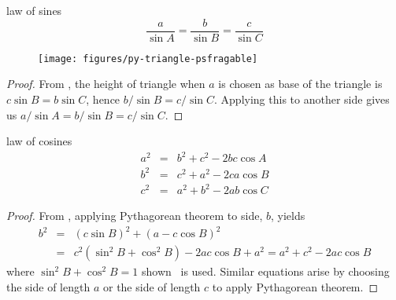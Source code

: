 \documentclass[17pt,landscape]{foils}
\begin{document}
{{

\bit
\item
	\bit
	\item
	\eit

\vitem
	\bit
	\item
	\eit
\eit



\begin{mylaw}{law of sines}
	$$
		\frac{a}{\sin A}
			=
		\frac{b}{\sin B}
			=
		\frac{c}{\sin C}
	$$
\end{mylaw}

\vfill
\begin{figure}
\begin{center}
	\texttt{[image: figures/py-triangle-psfragable]}%
		\label{fig:triangle}
\end{center}
\end{figure}

\vfill
\begin{proof}
	From , the height of triangle when $a$ is chosen as base of the triangle is $c\sin B = b\sin C$,
	hence $b/\sin B = c/\sin C$.
	Applying this to another side gives us $a/\sin A = b/\sin B = c/\sin C$.
\end{proof}



\begin{mylaw}{law of cosines}
	\begin{eqnarray*}
		a^2 &=& b^2 + c^2 - 2bc \cos A
		\\
		b^2 &=& c^2 + a^2 - 2ca \cos B
		\\
		c^2 &=& a^2 + b^2 - 2ab \cos C
	\end{eqnarray*}
\end{mylaw}

\vfill
\begin{proof}
	From , applying Pythagorean theorem to side, $b$,
	yields
	\begin{eqnarray*}
		b^2
			& = &
		(c\sin B)^2 + (a-c\cos B)^2
		\\
			&=&
		c^2 (\sin^2 B + \cos^2 B) - 2ac \cos B + a^2
			=
		a^2 + c^2 - 2ac \cos B
	\end{eqnarray*}
	where $\sin^2 B + \cos^2 B=1$ shown \ is used.
	Similar equations arise by choosing the side of length $a$ or the side of length $c$
	to apply Pythagorean theorem.
\end{proof}


}}
\end{document}
